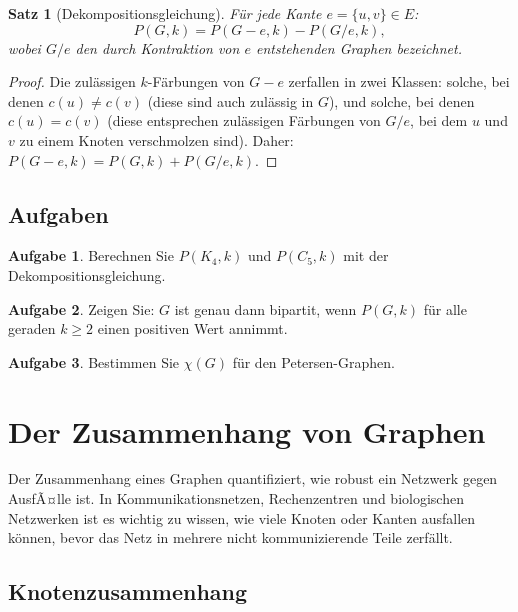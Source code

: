 ﻿\documentclass[a4paper,12pt,openany,oneside]{book}
\theoremstyle{definition}
\newtheorem{aufgabe}{Aufgabe}[chapter]
\theoremstyle{plain}
\newtheorem{satz}{Satz}[chapter]
\theoremstyle{remark}
\begin{document}
\begin{satz}[Dekompositionsgleichung]
  F\"ur jede Kante $e = \{u,v\} \in E$:
  \[
    P(G, k) = P(G - e, k) - P(G / e, k),
  \]
  wobei $G/e$ den durch Kontraktion von $e$ entstehenden Graphen bezeichnet.
\end{satz}

\begin{proof}
  Die zul\"assigen $k$-F\"arbungen von $G - e$ zerfallen in zwei Klassen:
  solche, bei denen $c(u) \neq c(v)$ (diese sind auch zul\"assig in $G$),
  und solche, bei denen $c(u) = c(v)$ (diese entsprechen zul\"assigen
  F\"arbungen von $G/e$, bei dem $u$ und $v$ zu einem Knoten verschmolzen
  sind). Daher: $P(G-e, k) = P(G, k) + P(G/e, k)$.
\end{proof}

\section{Aufgaben}

\begin{aufgabe}
  Berechnen Sie $P(K_4, k)$ und $P(C_5, k)$ mit der Dekompositionsgleichung.
\end{aufgabe}

\begin{aufgabe}
  Zeigen Sie: $G$ ist genau dann bipartit, wenn $P(G,k)$ f\"ur alle
  geraden $k \geq 2$ einen positiven Wert annimmt.
\end{aufgabe}

\begin{aufgabe}
  Bestimmen Sie $\chi(G)$ f\"ur den Petersen-Graphen.
\end{aufgabe}

\chapter{Der Zusammenhang von Graphen}

Der Zusammenhang eines Graphen quantifiziert, wie robust ein Netzwerk gegen
AusfÃ¤lle ist. In Kommunikationsnetzen, Rechenzentren und biologischen
Netzwerken ist es wichtig zu wissen, wie viele Knoten oder Kanten
ausfallen k\"onnen, bevor das Netz in mehrere nicht kommunizierende Teile
zerf\"allt.

\section{Knotenzusammenhang}
\end{document}
